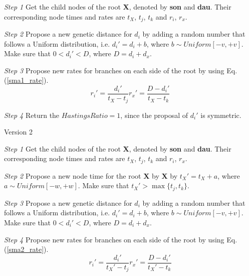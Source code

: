 \documentclass{bmcart}
\begin{document}
\emph{Step 1} Get the child nodes of the root \textbf{X}, denoted by \textbf{son} and \textbf{dau}. Their corresponding node times and rates are $t_X$, $t_j$, $t_k$ and $r_i$, $r_x$.

\emph{Step 2} Propose a new genetic distance for $d_i$ by adding a random number that follows a Uniform distribution, i.e.  ${d_i}' = {d_i} + b$, where $b \sim Uniform[ - v, + v]$. Make sure that $0 < {d_i}' < D$, where $D = {d_i} + {d_x}$.

\emph{Step 3} Propose new rates for branches on each side of the root by using Eq.(\ref{sma1_rate}).
\begin{subequations}\label{sma1_rate}
  \begin{equation}
{r_i}' = \frac{{{d_i}'}}{{{t_X} - {t_j}}}
  \end{equation}
  \begin{equation}
{r_x}' = \frac{{D - {d_i}'}}{{{t_X} - {t_k}}}
  \end{equation}
\end{subequations}

\emph{Step 4} Return the $HastingsRatio = 1$, since the proposal of  ${d_i}'$ is symmetric.

\begin{description}
\item[Version 2]
\end{description}

\emph{Step 1} Get the child nodes of the root \textbf{X}, denoted by \textbf{son} and \textbf{dau}. Their corresponding node times and rates are $t_X$, $t_j$, $t_k$ and $r_i$, $r_x$.

\emph{Step 2} Propose a new node time for the root \textbf{X} by \textbf{X} by ${t_X}' = {t_X} + a$, where $a \sim Uniform[ - w, + w]$. Make sure that ${t_X}' > \max \{ {t_j},{t_k}\} $.

\emph{Step 3} Propose a new genetic distance for $d_i$ by adding a random number that follows a Uniform distribution, i.e.  ${d_i}' = {d_i} + b$, where $b \sim Uniform[ - v, + v]$. Make sure that $0 < {d_i}' < D$, where $D = {d_i} + {d_x}$.

\emph{Step 4} Propose new rates for branches on each side of the root by using Eq.(\ref{sma2_rate}).
\begin{subequations}\label{sma2_rate}
  \begin{equation}
{r_i}' = \frac{{{d_i}'}}{{{t_X}' - {t_j}}}
  \end{equation}
  \begin{equation}
{r_x}' = \frac{{D - {d_i}'}}{{{t_X}' - {t_k}}}
  \end{equation}
\end{subequations}
\end{document}
